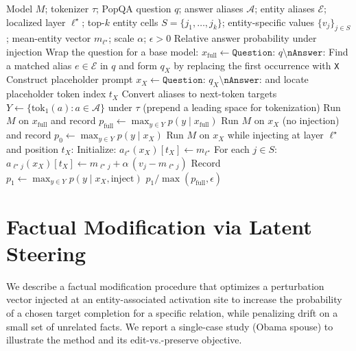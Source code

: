 \documentclass[10pt,twocolumn]{article}
\begin{document}
\begin{algorithm}[!h]
\caption{Controlled injection of entity cells in a QA-style prompt}
\label{alg:inject}
\begin{algorithmic}[1]
\Require Model $M$; tokenizer $\tau$; PopQA question $q$; answer aliases $\mathcal{A}$; entity aliases $\mathcal{E}$; localized layer $\ell^\star$; top-$k$ entity cells $S=\{j_1,\dots,j_k\}$; entity-specific values $\{v_{j}\}_{j\in S}$; mean-entity vector $m_{\ell^\star}$; scale $\alpha$; $\epsilon>0$
\Ensure Relative answer probability under injection
\State Wrap the question for a base model: $x_{\mathrm{full}} \gets \texttt{Question: }q\texttt{\textbackslash nAnswer:}$
\State Find a matched alias $e \in \mathcal{E}$ in $q$ and form $q_X$ by replacing the first occurrence with \texttt{X}
\State Construct placeholder prompt $x_X \gets \texttt{Question: }q_X\texttt{\textbackslash nAnswer:}$ and locate placeholder token index $t_X$
\State Convert aliases to next-token targets $Y \gets \{\mathrm{tok}_1(a): a\in \mathcal{A}\}$ under $\tau$ (prepend a leading space for tokenization)
\State Run $M$ on $x_{\mathrm{full}}$ and record $p_{\mathrm{full}} \gets \max_{y\in Y} p(y \mid x_{\mathrm{full}})$
\State Run $M$ on $x_X$ (no injection) and record $p_0 \gets \max_{y\in Y} p(y \mid x_X)$
\State Run $M$ on $x_X$ while injecting at layer $\ell^\star$ and position $t_X$:
\Statex \hspace{1em} Initialize: $a_{\ell^\star}(x_X)[t_X] \leftarrow m_{\ell^\star}$
\Statex \hspace{1em} For each $j \in S$: $a_{\ell^\star j}(x_X)[t_X] \leftarrow m_{\ell^\star j} + \alpha\,(v_j - m_{\ell^\star j})$
\State Record $p_1 \gets \max_{y\in Y} p(y \mid x_X,\mathrm{inject})$
\State \Return $p_1 / \max(p_{\mathrm{full}}, \epsilon)$
\end{algorithmic}
\end{algorithm}

\section{Factual Modification via Latent Steering}
\label{app:latent_steering}
We describe a factual modification procedure that optimizes a perturbation vector injected at an entity-associated activation site to increase the probability of a chosen target completion for a specific relation, while penalizing drift on a small set of unrelated facts. We report a single-case study (Obama spouse) to illustrate the method and its edit-vs.-preserve objective.
\end{document}
